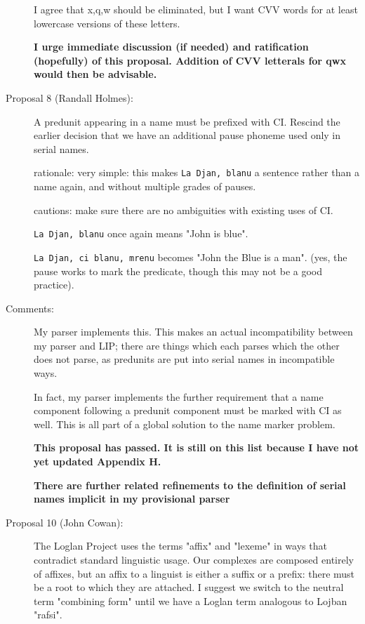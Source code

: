 \documentclass[12pt]{article}
\begin{document}
\begin{description}
I agree that x,q,w should be eliminated, but I want CVV words for at least lowercase versions of these letters.

{\bf I urge immediate discussion (if needed) and ratification (hopefully) of this proposal.  Addition of CVV letterals for qwx would then be advisable.}

\item[Proposal 8 (Randall Holmes):] A predunit 
appearing in a name must be prefixed with CI.  
Rescind the earlier decision that we have an 
additional pause phoneme used only in serial names.

rationale:  very simple:  this makes 
{\tt La Djan, blanu} a sentence rather than a name again, 
and without multiple grades of pauses.

cautions:  make sure there are no 
ambiguities with existing uses of CI.

{\tt La Djan, blanu} once again means "John is blue".

{\tt La Djan, ci blanu, mrenu}  becomes "John the Blue is a man".  
(yes, the pause works to mark the predicate,
though this may not be a good practice).

\item[Comments:]  My parser implements this.  This makes an 
actual incompatibility between my parser and LIP;
there are things which each parses which 
the other does not parse, as predunits are put into
serial names in incompatible ways.

In fact, my parser implements the further requirement that a name component following
a predunit component must be marked with CI as well.  This is all part of a global solution
to the name marker problem.

{\bf This proposal has passed.  It is still on this list because I have not yet updated Appendix H.}

{\bf There are further related refinements to the definition of serial names implicit in my provisional parser}



\item[ Proposal 10 (John Cowan):]

The Loglan Project uses the terms 
"affix" and "lexeme" in ways that
contradict standard linguistic usage.  
Our complexes are composed entirely
of affixes, but an affix to a linguist is
 either a suffix or a prefix:
there must be a root to which they 
are attached.  I suggest we switch to
the neutral term "combining form" 
until we have a Loglan term analogous
to Lojban "rafsi".


\end{description}
\end{document}
